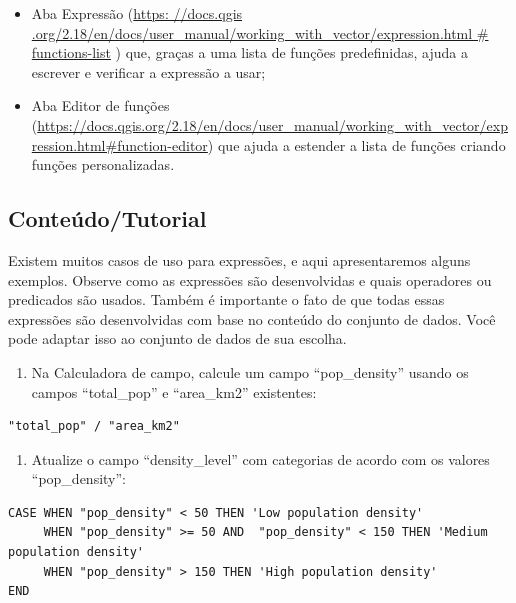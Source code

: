 \documentclass[
  portuguese,
]{krantz}
\providecommand{\tightlist}{%
  \setlength{\itemsep}{0pt}\setlength{\parskip}{0pt}}
\begin{document}
\begin{itemize}
\tightlist
\item
  Aba Expressão (\href{https://docs.qgis.org/2.18/en/docs/user_manual/working_with_vector/expression.html\#functions-list}{https: //docs.qgis .org/2.18/en/docs/user\_manual/working\_with\_vector/expression.html \# functions-list} ) que, graças a uma lista de funções predefinidas, ajuda a escrever e verificar a expressão a usar;
\item
  Aba Editor de funções (\href{https://docs.qgis.org/2.18/en/docs\%20/user_manual/working_with_vector/expression.html\#function-editor}{https://docs.qgis.org/2.18/en/docs/user\_manual/working\_with\_vector/expression.html\#function-editor}) que ajuda a estender a lista de funções criando funções personalizadas.
\end{itemize}

\hypertarget{conteuxfadotutorial-4}{%
\subsection{\texorpdfstring{\textbf{Conteúdo/Tutorial}}{Conteúdo/Tutorial}}\label{conteuxfadotutorial-4}}

Existem muitos casos de uso para expressões, e aqui apresentaremos alguns exemplos. Observe como as expressões são desenvolvidas e quais operadores ou predicados são usados. Também é importante o fato de que todas essas expressões são desenvolvidas com base no conteúdo do conjunto de dados. Você pode adaptar isso ao conjunto de dados de sua escolha.

\begin{enumerate}
\def\labelenumi{\arabic{enumi}.}
\tightlist
\item
  Na Calculadora de campo, calcule um campo ``pop\_density'' usando os campos ``total\_pop'' e ``area\_km2'' existentes:
\end{enumerate}

\begin{verbatim}
"total_pop" / "area_km2"
\end{verbatim}

\begin{enumerate}
\def\labelenumi{\arabic{enumi}.}
\setcounter{enumi}{1}
\tightlist
\item
  Atualize o campo ``density\_level'' com categorias de acordo com os valores ``pop\_density'':
\end{enumerate}

\begin{verbatim}
CASE WHEN "pop_density" < 50 THEN 'Low population density'
     WHEN "pop_density" >= 50 AND  "pop_density" < 150 THEN 'Medium population density'
     WHEN "pop_density" > 150 THEN 'High population density'
END
\end{verbatim}
\end{document}
